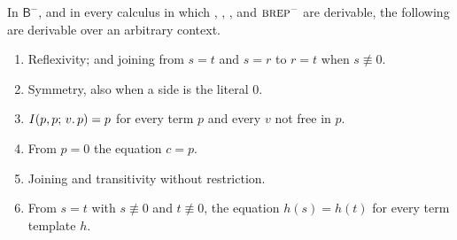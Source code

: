 \begin{lemma}
\label{kern:lem:bmeq}
In $\mathsf{B}^{-}$, and in every calculus in which ,
, ,  and $\rulename{BRep}^{-}$ are
derivable, the following are derivable over an arbitrary context.
\begin{enumerate}[label=\textup{(\roman*)}]
\item Reflexivity; and joining from $s=t$ and $s=r$ to $r=t$ when
 $s\not\equiv 0$.
\item Symmetry, also when a side is the literal $0$.
\item $I(p,p;\,v.\,p)=p$ for every term $p$ and every $v$ not free in $p$.
\item From $p=0$ the equation $c=p$.
\item Joining and transitivity without restriction.
\item From $s=t$ with $s\not\equiv 0$ and $t\not\equiv 0$, the equation
 $h(s)=h(t)$ for every term template $h$.
\end{enumerate}
\end{lemma}

